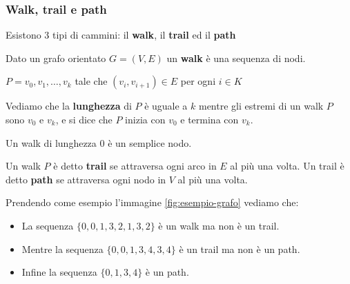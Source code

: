 \subsubsection{Walk, trail e path}
Esistono 3 tipi di cammini: il \textbf{walk}, il \textbf{trail} ed il \textbf{path}
\begin{definition}[Walk]
    Dato un grafo orientato $G = (V,E)$ un \textbf{walk} è una sequenza di nodi.
    \begin{center}
        $P = v_0, v_1, \ldots, v_k$ tale che $(v_i,v_{i+1}) \in E$ per ogni $i \in K$
    \end{center}
\end{definition}
\hspace{-15pt}Vediamo che la \textbf{lunghezza} di $P$ è uguale a $k$ mentre gli estremi di un walk $P$ sono $v_0$ e $v_k$, e si dice che $P$ inizia con $v_0$ e termina con $v_k$.
\begin{note}
Un walk di lunghezza $0$ è un semplice nodo.
\end{note}

\begin{definition}
    Un walk $P$ è detto \textbf{trail} se attraversa ogni arco in $E$ al più una volta. Un trail è detto \textbf{path} se attraversa ogni nodo in $V$ al più una volta.
\end{definition}

\begin{example}
    Prendendo come esempio l'immagine \ref{fig:esempio-grafo} vediamo che:
    \begin{itemize}
        \item La sequenza $\{0, 0, 1, 3, 2, 1, 3, 2\}$ è un walk ma non è un trail.
        \item Mentre la sequenza $\{0, 0, 1, 3, 4, 3, 4\}$ è un trail ma non è un path.
        \item Infine la sequenza $\{0, 1, 3, 4\}$ è un path.
    \end{itemize}
\end{example}

